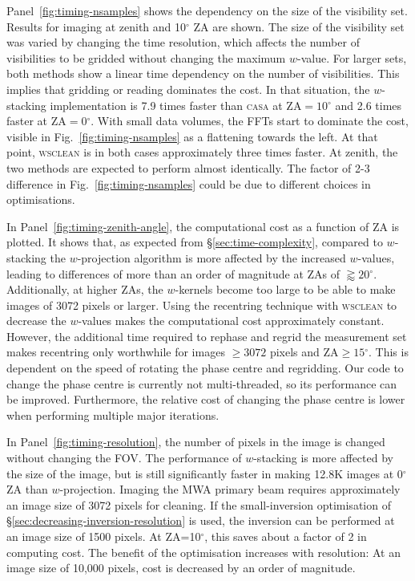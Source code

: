 \documentclass[useAMS,usenatbib]{mn2e}
\newcommand{\degree}{\ensuremath{^{\circ}}\xspace}
\begin{document}
Panel~\ref{fig:timing-nsamples} shows the dependency on the size of the visibility set. Results for imaging at zenith and 10\degree ZA are shown. The size of the visibility set was varied by changing the time resolution, which affects the number of visibilities to be gridded without changing the maximum $w$-value. For larger sets, both methods show a linear time dependency on the number of visibilities. This implies that gridding or reading dominates the cost. In that situation, the $w$-stacking implementation is 7.9 times faster than \textsc{casa} at $\textrm{ZA}=10\degree$ and 2.6 times faster at $\textrm{ZA}=0\degree$. With small data volumes, the FFTs start to dominate the cost, visible in Fig.~\ref{fig:timing-nsamples} as a flattening towards the left. At that point, \textsc{wsclean} is in both cases approximately three times faster. At zenith, the two methods are expected to perform almost identically. The factor of 2-3 difference in Fig.~\ref{fig:timing-nsamples} could be due to different choices in optimisations.

In Panel~\ref{fig:timing-zenith-angle}, the computational cost as a function of ZA is plotted. It shows that, as expected from \S\ref{sec:time-complexity}, compared to $w$-stacking the $w$-projection algorithm is more affected by the increased $w$-values, leading to differences of more than an order of magnitude at ZAs of $\gtrapprox 20$\degree. Additionally, at higher ZAs, the $w$-kernels become too large to be able to make images of 3072 pixels or larger. Using the recentring technique with \textsc{wsclean} to decrease the $w$-values makes the computational cost approximately constant. However, the additional time required to rephase and regrid the measurement set makes recentring only worthwhile for images $\ge3072$ pixels and $\textrm{ZA}\ge15\degree$. This is dependent on the speed of rotating the phase centre and regridding. Our code to change the phase centre is currently not multi-threaded, so its performance can be improved. Furthermore, the relative cost of changing the phase centre is lower when performing multiple major iterations.

In Panel~\ref{fig:timing-resolution}, the number of pixels in the image is changed without changing the FOV. The performance of $w$-stacking is more affected by the size of the image, but is still significantly faster in making 12.8K images at 0\degree ZA than $w$-projection. Imaging the MWA primary beam requires approximately an image size of 3072 pixels for cleaning. If the small-inversion optimisation of \S\ref{sec:decreasing-inversion-resolution} is used, the inversion can be performed at an image size of 1500 pixels. At ZA=10\degree, this saves about a factor of 2 in computing cost. The benefit of the optimisation increases with resolution: At an image size of 10,000 pixels, cost is decreased by an order of magnitude.
\end{document}
